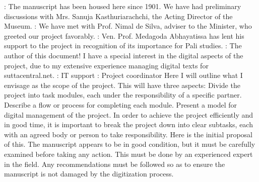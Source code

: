 : The manuscript has been housed here since 1901. We have had preliminary discussions with Mrs. Sanuja Kasthuriarachchi, the Acting Director of the Museum.\markdownRendererOlItemEnd 
{}: We have met with Prof. Nimal de Silva, adviser to the Minister, who greeted our project favorably.\markdownRendererOlItemEnd 
{}: Ven. Prof. Medagoda Abhayatissa has lent his support to the project in recognition of its importance for Pali studies.\markdownRendererOlItemEnd 
{}: The author of this document! I have a special interest in the digital aspects of the project, due to my extensive experience managing digital texts for suttacentral.net.\markdownRendererOlItemEnd 
{}: IT support\markdownRendererOlItemEnd 
{}: Project coordinator\markdownRendererOlItemEnd 
\markdownRendererOlEndTight \markdownRendererInterblockSeparator
{}\markdownRendererInterblockSeparator
{}Here I will outline what I envisage as the scope of the project. This will have three aspects:\markdownRendererInterblockSeparator
{}\markdownRendererOlBeginTight
{}Divide the project into task modules, each under the responsibility of a specific partner.\markdownRendererOlItemEnd 
{}Describe a flow or process for completing each module.\markdownRendererOlItemEnd 
{}Present a model for digital management of the project.\markdownRendererOlItemEnd 
\markdownRendererOlEndTight \markdownRendererInterblockSeparator
{}\markdownRendererInterblockSeparator
{}In order to achieve the project efficiently and in good time, it is important to break the project down into clear subtasks, each with an agreed body or person to take responsibility. Here is the initial proposal of this.\markdownRendererInterblockSeparator
{}\markdownRendererInterblockSeparator
{}The manuscript appears to be in good condition, but it must be carefully examined before taking any action. This must be done by an experienced expert in the field. Any recommendations must be followed so as to ensure the manuscript is not damaged by the digitization process.\markdownRendererInterblockSeparator
